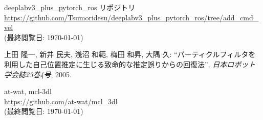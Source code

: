 \documentclass[uplatex, twocolumn, 9pt]{jsproceedings}
\begin{document}
\begin{thebibliography}{99}
deeplabv3\_plus\_pytorch\_ros リポジトリ\\
\url{https://github.com/Tsumoridesu/deeplabv3_plus_pytorch_ros/tree/add_cmd_vel}\\
(最終閲覧日: \today)

上田 隆一, 新井 民夫, 浅沼 和範, 梅田 和昇, 大隅 久: ``パーティクルフィルタを利用した自己位置推定に生じる致命的な推定誤りからの回復法'', \textit{日本ロボット学会誌23巻4号}, 2005.

at-wat, mcl-3dl\\
\url{https://github.com/at-wat/mcl_3dl}\\
(最終閲覧日: \today)

\end{thebibliography}
\normalsize
\end{document}
